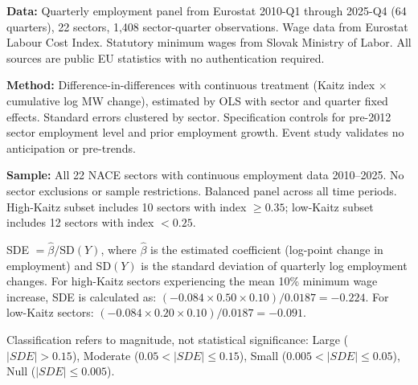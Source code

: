 \begin{table}[H]
\begin{flushleft}
\textbf{Data:} Quarterly employment panel from Eurostat 2010-Q1 through 2025-Q4 (64 quarters), 22 sectors, 1,408 sector-quarter observations. Wage data from Eurostat Labour Cost Index. Statutory minimum wages from Slovak Ministry of Labor. All sources are public EU statistics with no authentication required.

\textbf{Method:} Difference-in-differences with continuous treatment (Kaitz index $\times$ cumulative log MW change), estimated by OLS with sector and quarter fixed effects. Standard errors clustered by sector. Specification controls for pre-2012 sector employment level and prior employment growth. Event study validates no anticipation or pre-trends.

\textbf{Sample:} All 22 NACE sectors with continuous employment data 2010--2025. No sector exclusions or sample restrictions. Balanced panel across all time periods. High-Kaitz subset includes 10 sectors with index $\geq 0.35$; low-Kaitz subset includes 12 sectors with index $< 0.25$.

SDE $= \hat{\beta} / \text{SD}(Y)$, where $\hat{\beta}$ is the estimated coefficient (log-point change in employment) and SD$(Y)$ is the standard deviation of quarterly log employment changes. For high-Kaitz sectors experiencing the mean 10\% minimum wage increase, SDE is calculated as: $(-0.084 \times 0.50 \times 0.10) / 0.0187 = -0.224$. For low-Kaitz sectors: $(-0.084 \times 0.20 \times 0.10) / 0.0187 = -0.091$.

Classification refers to magnitude, not statistical significance: Large ($|SDE| > 0.15$), Moderate ($0.05 < |SDE| \leq 0.15$), Small ($0.005 < |SDE| \leq 0.05$), Null ($|SDE| \leq 0.005$).

\end{flushleft}
\end{table}
